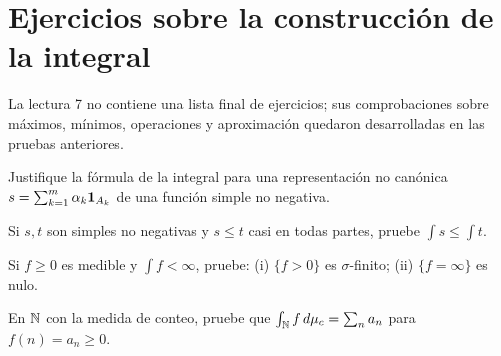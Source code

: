 \section{Ejercicios sobre la construcción de la integral}
La lectura 7 no contiene una lista final de ejercicios; sus comprobaciones sobre máximos, mínimos, operaciones y aproximación quedaron desarrolladas en las pruebas anteriores.
\begin{ejercicio}\label{ej:v2-l08-1}
Justifique la fórmula de la integral para una representación no canónica $s=\sum_{k=1}^m\alpha_k\mathbf1_{A_k}$ de una función simple no negativa.
\end{ejercicio}

\begin{ejercicio}\label{ej:v2-l08-2}
Si $s,t$ son simples no negativas y $s\le t$ casi en todas partes, pruebe $\int s\le\int t$.
\end{ejercicio}

\begin{ejercicio}\label{ej:v2-l08-3}
Si $f\ge0$ es medible y $\int f<\infty$, pruebe: (i) $\{f>0\}$ es $\sigma$-finito; (ii) $\{f=\infty\}$ es nulo.
\end{ejercicio}

\begin{ejercicio}\label{ej:v2-l08-4}
En $\mathbb N$ con la medida de conteo, pruebe que $\int_\mathbb N f\,d\mu_c=\sum_na_n$ para $f(n)=a_n\ge0$.
\end{ejercicio}
